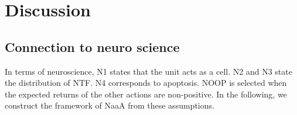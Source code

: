 \section{Discussion}

\subsection{Connection to neuro science}
In terms of neuroscience,
N1 states that the unit acts as a cell.
N2 and N3 state the distribution of NTF. N4 corresponds to apoptosis.
NOOP is selected when the expected returns of the other actions are non-positive.
In the following, we construct the framework of NaaA from these assumptions.

